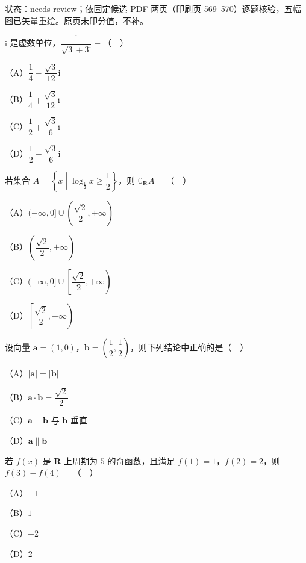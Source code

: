 

状态：needs-review；依固定候选 PDF 两页（印刷页 569–570）逐题核验，五幅图已矢量重绘。原页未印分值，不补。


\begin{question}
$\mathrm i$ 是虚数单位，$\dfrac{\mathrm i}{\sqrt3+3\mathrm i}=$（　）

（A）$\dfrac14-\dfrac{\sqrt3}{12}\mathrm i$

（B）$\dfrac14+\dfrac{\sqrt3}{12}\mathrm i$

（C）$\dfrac12+\dfrac{\sqrt3}{6}\mathrm i$

（D）$\dfrac12-\dfrac{\sqrt3}{6}\mathrm i$

\end{question}
\begin{question}
若集合 $A=\left\{x\middle|\log_{\frac12}x\geqslant\dfrac12\right\}$，则 $\complement_{\mathbf R}A=$（　）

（A）$(-\infty,0]\cup\left(\dfrac{\sqrt2}2,+\infty\right)$

（B）$\left(\dfrac{\sqrt2}2,+\infty\right)$

（C）$(-\infty,0]\cup\left[\dfrac{\sqrt2}2,+\infty\right)$

（D）$\left[\dfrac{\sqrt2}2,+\infty\right)$

\end{question}
\begin{question}
设向量 $\boldsymbol a=(1,0)$，$\boldsymbol b=\left(\dfrac12,\dfrac12\right)$，则下列结论中正确的是（　）

（A）$|\boldsymbol a|=|\boldsymbol b|$

（B）$\boldsymbol a\cdot\boldsymbol b=\dfrac{\sqrt2}2$

（C）$\boldsymbol a-\boldsymbol b$ 与 $\boldsymbol b$ 垂直

（D）$\boldsymbol a\parallel\boldsymbol b$

\end{question}
\begin{question}
若 $f(x)$ 是 $\mathbf R$ 上周期为 $5$ 的奇函数，且满足 $f(1)=1$，$f(2)=2$，则 $f(3)-f(4)=$（　）

（A）$-1$

（B）$1$

（C）$-2$

（D）$2$

\end{question}
